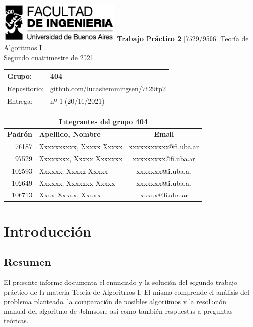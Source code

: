 \documentclass[titlepage,a4paper]{article}
\begin{document}
\begin{titlepage} %
	\hfill\includegraphics[width=6cm]{img/logofiuba.jpg}
    \centering
    \vfill
    \Huge \textbf{Trabajo Práctico 2}
    \vskip2cm
    \Large [7529/9506] Teoría de Algoritmos I\\
    Segundo cuatrimestre de 2021
    \vfill
    \begin{tabular}{ | l | l | } %
      \hline
      Grupo: & 404 \\ \hline
      Repositorio: & github.com/lucashemmingsen/7529tp2 \\ \hline
      Entrega: & nº 1 (20/10/2021) \\ \hline
  	\end{tabular}
    \vfill
    \begin{tabular}{@{}rlc@{}}
    \multicolumn{3}{c}{Integrantes del grupo 404}                                 \\ \midrule
    \textbf{Padrón} & \textbf{Apellido, Nombre}           & \textbf{Email}        \\ \midrule
    76187           & Xxxxxxxxxx, Xxxxx Xxxxx     & xxxxxxxxxxx@fi.uba.ar \\
    97529           & Xxxxxxxx, Xxxxx Xxxxxxx     & xxxxxxxxx@fi.uba.ar   \\
    102593          & Xxxxxx, Xxxxx Xxxxx         & xxxxxxx@fi.uba.ar     \\
    102649          & Xxxxxx, Xxxxxxx Xxxxx       & xxxxxxx@fi.uba.ar     \\
    106713          & Xxxx Xxxxx, Xxxxx           & xxxxx@fi.uba.ar      \\ \bottomrule
    \end{tabular}
    \vfill
\end{titlepage}

\tableofcontents %
\newpage

\section{Introducción}\label{sec:intro}
\subsection{Resumen}
El presente informe documenta el enunciado y la solución del segundo trabajo práctico
de la materia Teoría de Algoritmos I. El mismo comprende el análisis del problema
planteado, la comparación de posibles algoritmos y la resolución manual del algoritmo
de Johnsosn; así como también respuestas a preguntas teóricas.
\end{document}
